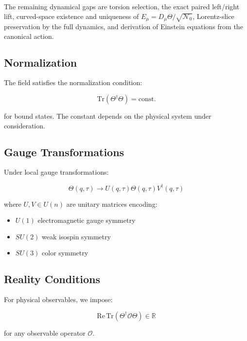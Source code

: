 The remaining dynamical gaps are torsion selection, the exact paired
left/right lift, curved-space existence and uniqueness of
$E_\mu=D_\mu\Theta/\sqrt{\mathcal N_0}$, Lorentz-slice preservation by the full
dynamics, and derivation of Einstein equations from the canonical action.

\subsection{Normalization}

The field satisfies the normalization condition:

\begin{equation}
\label{eq:canonical:theta_normalization}
\text{Tr}(\Theta^\dagger \Theta) = \text{const.}
\end{equation}

for bound states. The constant depends on the physical system under consideration.

\subsection{Gauge Transformations}

Under local gauge transformations:

\begin{equation}
\label{eq:canonical:theta_gauge}
\Theta(q,\tau) \to U(q,\tau) \Theta(q,\tau) V^\dagger(q,\tau)
\end{equation}

\noindent where $U,V \in U(n)$ are unitary matrices encoding:
\begin{itemize}
    \item $U(1)$ electromagnetic gauge symmetry
    \item $SU(2)$ weak isospin symmetry
    \item $SU(3)$ color symmetry
\end{itemize}

\subsection{Reality Conditions}

For physical observables, we impose:

\begin{equation}
\label{eq:canonical:theta_reality}
\text{Re}\,\text{Tr}(\Theta^\dagger \mathcal{O} \Theta) \in \mathbb{R}
\end{equation}

for any observable operator $\mathcal{O}$.

